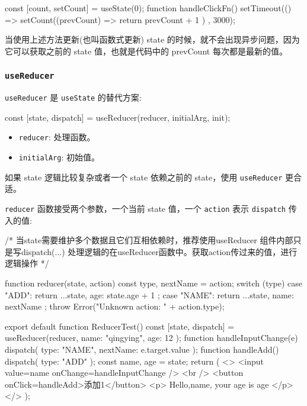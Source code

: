\begin{JavaScript}
const [count, setCount] = useState(0);
function handleClickFn() {
  setTimeout(() => {
    setCount((prevCount) => {
      return prevCount + 1
    })
  }, 3000);
}
\end{JavaScript}

当使用上述方法更新(也叫函数式更新) state 的时候，就不会出现异步问题，因为它可以获取之前的 state 值，也就是代码中的 prevCount 每次都是最新的值。

\subsubsection{\texttt{useReducer}}

\texttt{useReducer} 是 \texttt{useState} 的替代方案:

\begin{JavaScript}
const [state, dispatch] = useReducer(reducer, initialArg, init);
\end{JavaScript}

\begin{itemize}
    \item \texttt{reducer}: 处理函数。
    \item \texttt{initialArg}: 初始值。
\end{itemize}

如果 state 逻辑比较复杂或者一个 state 依赖之前的 state，使用 \texttt{useReducer} 更合适。

\texttt{reducer} 函数接受两个参数，一个当前 state 值，一个 \texttt{action} 表示 \texttt{dispatch} 传入的值:

\begin{JavaScript}
/* 当state需要维护多个数据且它们互相依赖时，推荐使用useReducer
组件内部只是写dispatch({...})
处理逻辑的在useReducer函数中。获取action传过来的值，进行逻辑操作
*/

function reducer(state, action) {
  const { type, nextName } = action;
  switch (type) {
    case "ADD":
      return {
        ...state,
        age: state.age + 1
      };
    case "NAME":
      return {
        ...state,
        name: nextName
      };
  }
  throw Error("Unknown action: " + action.type);
}

export default function ReducerTest() {
  const [state, dispatch] = useReducer(reducer, { name: "qingying", age: 12 });
  function handleInputChange(e) {
    dispatch({
      type: "NAME",
      nextName: e.target.value
    });
  }
  function handleAdd() {
    dispatch({
      type: "ADD"
    });
  }
  const { name, age } = state;
  return (
    <>
      <input value={name} onChange={handleInputChange} />
      <br />
      <button onClick={handleAdd}>添加1</button>
      <p>
        Hello,{name}, your age is {age}
      </p>
    </>
  );
}
\end{JavaScript}

